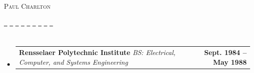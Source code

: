 \documentclass[letterpaper,11pt]{article}
\makeatletter
\newcommand{\resumeSubheading}[4]{
    \vspace{-2pt}\item
    \begin{tabular*}{1.0\textwidth}[t]{l@{\extracolsep{\fill}}r}
    \textbf{#1}  \textit{\small#3} & \textbf{\small #2} \\
    \end{tabular*}\vspace{-7pt}
}
\newcommand{\resumeSubHeadingListStart}{\begin{itemize}[leftmargin=0.0in, label={}]}
\newcommand{\resumeSubHeadingListEnd}{\end{itemize}}
\newcommand{\sectionwithnote}[2]{%
    \section[#1]{%
        \noindent
        \makebox[\textwidth]{\textbf{\Large #1} \hfill \textit{#2}}%
    }%
}
\makeatother
\begin{document}

    \begin{center}
    {\Huge \scshape Paul Charlton} \\
    \vspace{4pt}

    \href{mailto:techguru@byiq.com}{\raisebox{-0.2\height}\faEnvelope\ } \quad
    \href{https://github.com/PaulCharlton}{\raisebox{-0.2\height}\faGithub\ } \quad
    \href{https://gitlab.com/techguru}{\raisebox{-0.2\height}\faGitlab\ } \quad
    \href{https://www.linkedin.com/in/techguru/}{\raisebox{-0.2\height}\faLinkedin\ } \quad
    \href{https://paul-charlton.vercel.app/}{\raisebox{-0.2\height}\faGlobe\ } \quad
    \href{https://en.wikipedia.org/wiki/Paul_Charlton_(technologist)}{\raisebox{-0.2\height}\faWikipediaW\ } \quad
    \href{tel:+18082787904}{\raisebox{-0.2\height}\faPhone\ } \quad
    \href{https://signal.me/#p/+18082787904}{\raisebox{-0.2\height}\faComment\ } \quad
    \href{https://wa.me/18082787904}{\raisebox{-0.2\height}\faWhatsapp\ }

    \vspace{-8pt}
    \end{center}



    \sectionwithnote{EDUCATION}{}
    \resumeSubHeadingListStart
    \resumeSubheading
    {Rensselaer Polytechnic Institute}
    {Sept. 1984 -- May 1988}
    {BS: Electrical, Computer, and Systems Engineering}
    {Troy, New York}
    \resumeSubHeadingListEnd
\end{document}
